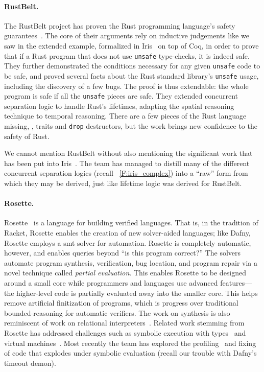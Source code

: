 \paragraph{RustBelt.} The RustBelt project has proven the Rust programming
language's safety guarantees~\cite{Jung_2018a,Jung_2021}. The core of their
arguments rely on inductive judgements like we saw in the extended example,
formalized in Iris~\cite{Jung_2018b} on top of Coq, in order to prove that if a
Rust program that does not use \texttt{unsafe} type-checks, it is indeed safe.
They further demonstrated the conditions necessary for any given \texttt{unsafe}
code to be safe, and proved several facts about the Rust standard library's
\texttt{unsafe} usage, including the discovery of a few bugs. The proof is thus
extendable: the whole program is safe if all the \texttt{unsafe} pieces are
safe. They extended concurrent separation logic to handle Rust's lifetimes,
adapting the spatial reasoning technique to temporal reasoning. There are a few
pieces of the Rust language missing, \eg, traits and \texttt{drop} destructors,
but the work brings new confidence to the safety of Rust.

We cannot mention RustBelt without also mentioning the significant work that has
been put into Iris~\cite{Jung_2015,Jung_2016,Krebbers_2017a,Jung_2018b}. The
team has managed to distill many of the different concurrent separation logics
(recall \figurename~\ref{F:iris_complex}) into a ``raw'' form from which they
may be derived, just like lifetime logic was derived for RustBelt.

\paragraph{Rosette.} Rosette~\cite{Rosette,Torlak_2013} is a language for
building verified languages. That is, in the tradition of Racket, Rosette
enables the creation of new solver-aided languages; like Dafny, Rosette employs
a \gls{smt} solver for automation. Rosette is completely automatic, however, and
enables queries beyond ``is this program correct?'' The solvers automate program
synthesis, verification, bug location, and program repair via a novel technique
called \emph{partial evaluation}. This enables Rosette to be designed around a
small core while programmers and languages use advanced features---the
higher-level code is partially evaluated away into the smaller core. This helps
remove artificial finitization of programs, which is progress over traditional
bounded-reasoning for automatic verifiers. The work on synthesis is also
reminiscent of work on relational interpreters~\cite{Byrd_2012}. Related work
stemming from Rosette has addressed challenges such as symbolic execution with
types~\cite{Chang_2018} and virtual machines~\cite{Torlak_2014}. Most recently
the team has explored the profiling~\cite{Bornholt_2018} and
fixing~\cite{Porncharoenwase_2020} of code that explodes under symbolic
evaluation (recall our trouble with Dafny's timeout demon).

